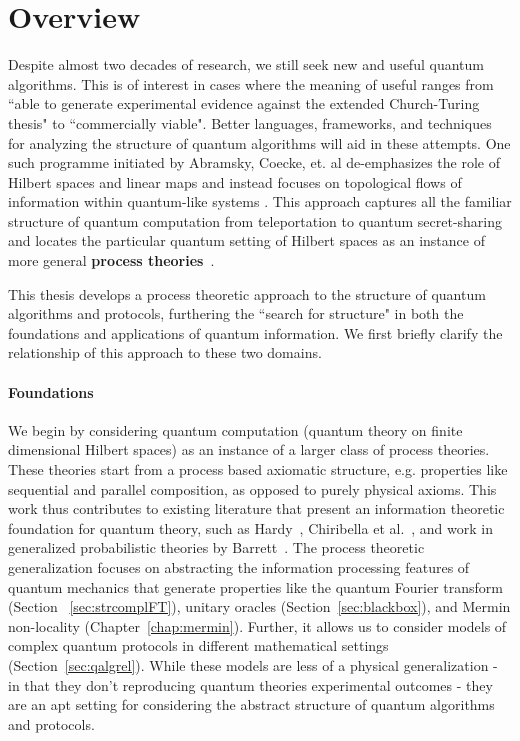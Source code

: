 \chapter{Overview}

Despite almost two decades of research, we still seek new and useful quantum algorithms.  This is of interest in cases where the meaning of useful ranges from ``able to generate experimental evidence against the extended Church-Turing thesis" to ``commercially viable". Better languages, frameworks, and techniques for analyzing the structure of quantum algorithms will aid in these attempts.  One such  programme initiated by Abramsky, Coecke, et. al de-emphasizes the role of Hilbert spaces and linear maps and instead focuses on topological flows of information within quantum-like systems
\cite{abramsky2008categorical,coecke2011interacting,coecke2013new}. This approach captures all the familiar structure of quantum computation from teleportation  to quantum secret-sharing and locates the particular quantum setting of Hilbert spaces as an instance of more general
\textbf{process theories}~\cite{coecke2015generalised,qcs-notes,coecke2011categories}. 

This thesis develops a process theoretic approach to the structure of quantum algorithms and protocols, furthering the ``search for structure" in both the foundations and applications of quantum information. We first briefly clarify the relationship of this approach to these two domains.
 
\subsubsection*{Foundations}

We begin by considering quantum computation (quantum theory on finite dimensional Hilbert spaces) as an instance of a larger class of process theories. These theories start from a process based axiomatic structure, e.g. properties like sequential and parallel composition, as opposed to purely physical axioms. This work thus contributes to existing literature that present an information theoretic foundation for quantum theory, such as Hardy~\cite{hardy2001quantum}, Chiribella et al.~\cite{chiribella2011informational}, and work in generalized probabilistic theories by Barrett~\cite{barrett2007information}.  The process theoretic generalization focuses on abstracting the information processing features of quantum mechanics that generate properties like the quantum Fourier transform (Section ~\ref{sec:strcomplFT}), unitary oracles (Section~\ref{sec:blackbox}), and Mermin non-locality (Chapter~\ref{chap:mermin}). Further, it allows us to consider models of complex quantum protocols in different mathematical settings (Section~\ref{sec:qalgrel}). While these models are less of a physical generalization - in that they don't reproducing quantum theories experimental outcomes - they are an apt setting for considering the abstract structure of quantum algorithms and protocols.

